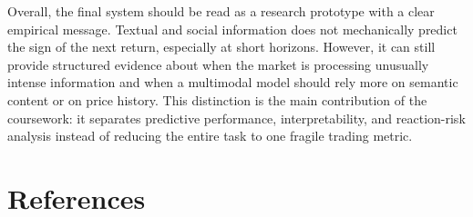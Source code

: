 \documentclass[12pt, a4paper]{article}
\begin{document}
Overall, the final system should be read as a research prototype with a clear empirical message. Textual and social information does not mechanically predict the sign of the next return, especially at short horizons. However, it can still provide structured evidence about when the market is processing unusually intense information and when a multimodal model should rely more on semantic content or on price history. This distinction is the main contribution of the coursework: it separates predictive performance, interpretability, and reaction-risk analysis instead of reducing the entire task to one fragile trading metric.

\section*{References}
\end{document}
